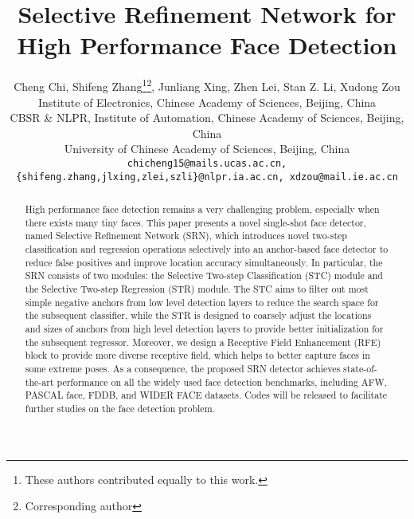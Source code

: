 \documentclass[letterpaper]{article} \usepackage{aaai19m}  \usepackage{times}  \usepackage{helvet}  \usepackage{courier}  \usepackage{url}  \usepackage{graphicx}  \usepackage{subfigure}
\begin{document}
\title{Selective Refinement Network for High Performance Face Detection}
\author{
Cheng Chi, Shifeng Zhang\thanks{These authors contributed equally to this work.}\thanks{Corresponding author}, Junliang Xing, Zhen Lei, Stan Z. Li, Xudong Zou\\
 Institute of Electronics, Chinese Academy of Sciences, Beijing, China\\
CBSR \& NLPR, Institute of Automation, Chinese Academy of Sciences, Beijing, China\\
University of Chinese Academy of Sciences, Beijing, China\\
{\tt\small chicheng15@mails.ucas.ac.cn, \{shifeng.zhang,jlxing,zlei,szli\}@nlpr.ia.ac.cn, xdzou@mail.ie.ac.cn}\\
}
\maketitle

\begin{abstract}
High performance face detection remains a very challenging problem, especially when there exists many tiny faces. This paper presents a novel single-shot face detector, named Selective Refinement Network (SRN), which introduces novel two-step classification and regression operations selectively into an anchor-based face detector to reduce false positives and improve location accuracy simultaneously. In particular, the SRN consists of two modules: the Selective Two-step Classification (STC) module and the Selective Two-step Regression (STR) module. The STC aims to filter out most simple negative anchors from low level detection layers to reduce the search space for the subsequent classifier, while the STR is designed to coarsely adjust the locations and sizes of anchors from high level detection layers to provide better initialization for the subsequent regressor. Moreover, we design a Receptive Field Enhancement (RFE) block to provide more diverse receptive field, which helps to better capture faces in some extreme poses. As a consequence, the proposed SRN detector achieves state-of-the-art performance on all the widely used face detection benchmarks, including AFW, PASCAL face, FDDB, and WIDER FACE datasets. Codes will be released to facilitate further studies on the face detection problem.
\end{abstract}
\end{document}
